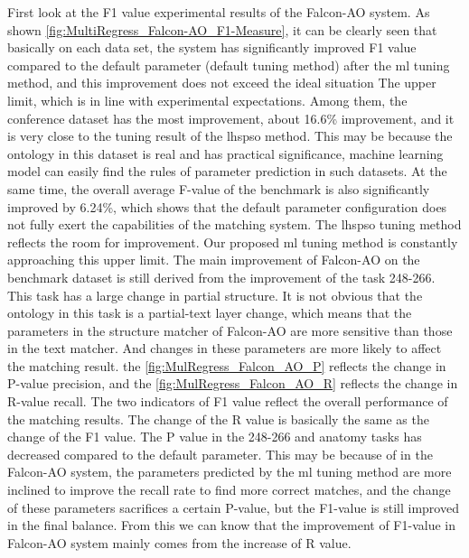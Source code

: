 \documentclass[twoside]{article}
\begin{document}
First look at the F1 value experimental results of the Falcon-AO system.
As shown \ref{fig:MultiRegress_Falcon-AO_F1-Measure}, it can be clearly seen that basically on each data set, the system has significantly improved F1 value compared to the default parameter (default tuning method) after the ml tuning method, and this improvement does not exceed the ideal situation The upper limit, which is in line with experimental expectations.
Among them, the conference dataset has the most improvement, about 16.6\% improvement, and it is very close to the tuning result of the lhspso method. This may be because the ontology in this dataset is real and has practical significance, machine learning model can easily find the rules of parameter prediction in such datasets.
At the same time, the overall average F-value of the benchmark is also significantly improved by 6.24\%, which shows that the default parameter configuration does not fully exert the capabilities of the matching system. The lhspso tuning method reflects the room for improvement. Our proposed ml tuning method is constantly approaching this upper limit.
The main improvement of Falcon-AO on the benchmark dataset is still derived from the improvement of the task 248-266. This task has a large change in partial structure. It is not obvious that the ontology in this task is a partial-text layer change, which means that the parameters in the structure matcher of Falcon-AO are more sensitive than those in the text matcher. And changes in these parameters are more likely to affect the matching result.
the \ref{fig:MulRegress_Falcon_AO_P} reflects the change in P-value precision, and the \ref{fig:MulRegress_Falcon_AO_R} reflects the change in R-value recall. The two indicators of F1 value reflect the overall performance of the matching results.
The change of the R value is basically the same as the change of the F1 value. The P value in the 248-266 and anatomy tasks has decreased compared to the default parameter. This may be because of in the Falcon-AO system, the parameters predicted by the ml tuning method are more inclined to improve the recall rate to find more correct matches, and the change of these parameters sacrifices a certain P-value, but the F1-value is still improved in the final balance. From this we can know that the improvement of F1-value in Falcon-AO system mainly comes from the increase of R value.
\end{document}
